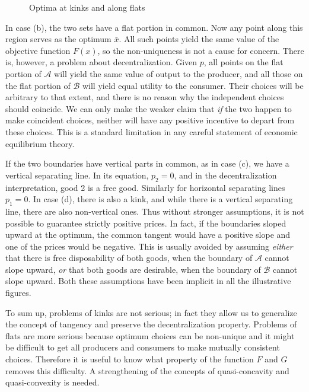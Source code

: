 \begin{figure}[!htp]
{\begin{minipage}{0.5\linewidth}
   \end{minipage} }
 \caption{Optima at kinks and along flats} \label{Fig6.4} 
\end{figure}

In case (b), the two sets have a flat portion in common. Now any point along this region serves as the optimum $\bar{x}$. All such points yield the same value of the objective function $F(x)$, so the non-uniqueness is not a cause for concern. There is, however, a problem about decentralization. Given $p$, all points on the flat portion of $\mathcal{A}$ will yield the same value of output to the producer, and all those on the flat portion of $\mathcal{B}$ will yield equal utility to the consumer. Their choices will be arbitrary to that extent, and there is no reason why the independent choices should coincide. We can only make the weaker claim that \textit{if} the two happen to make coincident choices, neither will have any positive incentive to depart from these choices. This is a standard limitation in any careful statement of economic equilibrium theory.

If the two boundaries have vertical parts in common, as in case (c), we have a vertical separating line. In its equation, $p_2=0$, and in the decentralization interpretation, good 2 is a free good. Similarly for horizontal separating lines $p_1=0$. In case (d), there is also a kink, and while there is a vertical separating line, there are also non-vertical ones. Thus without stronger assumptions, it is not possible to guarantee strictly positive prices. In fact, if the boundaries sloped upward at the optimum, the common tangent would have a positive slope and one of the prices would be negative. This is usually avoided by assuming \textit{either} that there is free disposability of both goods, when the boundary of $\mathcal{A}$ cannot slope upward, \textit{or} that both goods are desirable, when the boundary of $\mathcal{B}$ cannot slope upward. Both these assumptions have been implicit in all the illustrative figures.

To sum up, problems of kinks are not serious; in fact they allow us to generalize the concept of tangency and preserve the decentralization property. Problems of flats are more serious because optimum choices can be non-unique and it might be difficult to get all producers and consumers to make mutually consistent choices. Therefore it is useful to know what property of the function $F$ and $G$ removes this difficulty. A strengthening of the concepts of quasi-concavity and quasi-convexity is needed.

